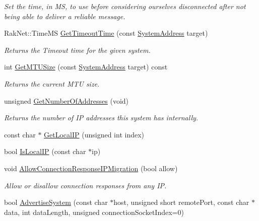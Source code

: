 \begin{DoxyCompactItemize}
\begin{DoxyCompactList}\small\item\em Set the time, in M\-S, to use before considering ourselves disconnected after not being able to deliver a reliable message. \end{DoxyCompactList}\item 
Rak\-Net\-::\-Time\-M\-S \hyperlink{class_rak_net_1_1_rak_peer_a12dc51372f2a5a109f3c6a55ba799763}{Get\-Timeout\-Time} (const \hyperlink{struct_rak_net_1_1_system_address}{System\-Address} target)
\begin{DoxyCompactList}\small\item\em Returns the Timeout time for the given system. \end{DoxyCompactList}\item 
int \hyperlink{class_rak_net_1_1_rak_peer_af5948dcad656f51305ed20c8b38e529b}{Get\-M\-T\-U\-Size} (const \hyperlink{struct_rak_net_1_1_system_address}{System\-Address} target) const 
\begin{DoxyCompactList}\small\item\em Returns the current M\-T\-U size. \end{DoxyCompactList}\item 
unsigned \hyperlink{class_rak_net_1_1_rak_peer_aca51c8583f3995217a940bf592d7140c}{Get\-Number\-Of\-Addresses} (void)
\begin{DoxyCompactList}\small\item\em Returns the number of I\-P addresses this system has internally. \end{DoxyCompactList}\item 
const char $\ast$ \hyperlink{class_rak_net_1_1_rak_peer_aa78c5de86816a54cae137bffb7e49bc5}{Get\-Local\-I\-P} (unsigned int index)
\item 
bool \hyperlink{class_rak_net_1_1_rak_peer_ad89d80f939408a620a5e41eeab0a588a}{Is\-Local\-I\-P} (const char $\ast$ip)
\item 
void \hyperlink{class_rak_net_1_1_rak_peer_a3b24a4946b34071621b0b288b869f21f}{Allow\-Connection\-Response\-I\-P\-Migration} (bool allow)
\begin{DoxyCompactList}\small\item\em Allow or disallow connection responses from any I\-P. \end{DoxyCompactList}\item 
bool \hyperlink{class_rak_net_1_1_rak_peer_aecb0396cdb296a5df8b8266c8cce138d}{Advertise\-System} (const char $\ast$host, unsigned short remote\-Port, const char $\ast$data, int data\-Length, unsigned connection\-Socket\-Index=0)

\end{DoxyCompactItemize}
